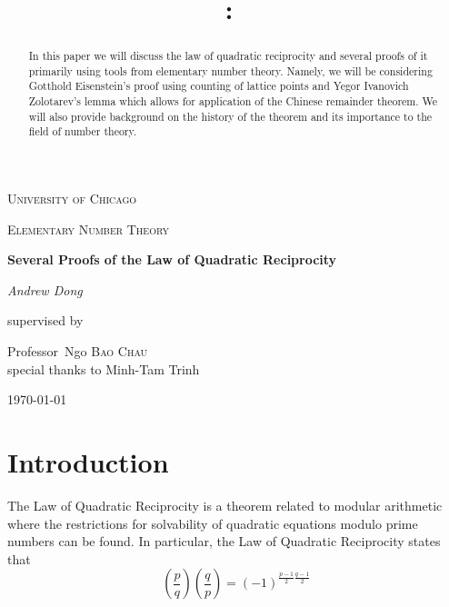\documentclass{article}
\title{\vspace{2in}\textmd{\textbf{\hmwkClass:\ \hmwkTitle}}\\\normalsize\vspace{0.1in}\vspace{0.1in}\large{\textit{\hmwkClassInstructor}}\vspace{3in}}
\date{}
\author{\textbf{\hmwkAuthorName}}
\begin{document}
\begin{spacing}{1.1}
\newpage


\clearpage

\begin{titlepage}
	\centering
	{\scshape\LARGE University of Chicago \par}
	\vspace{1cm}
	{\scshape\Large Elementary Number Theory\par}
	\vspace{1.5cm}
	{\huge\bfseries Several Proofs of the Law of Quadratic Reciprocity\par}
	\vspace{1cm}
	{\Large\itshape Andrew Dong\par}
	\vspace{2cm}
	\begin{abstract}
In this paper we will discuss the law of quadratic reciprocity and several proofs of it primarily using tools from elementary number theory.  Namely, we will be considering Gotthold Eisenstein's proof using counting of lattice points and Yegor Ivanovich Zolotarev's lemma which allows for application of the Chinese remainder theorem.  We will also provide background on the history of the theorem and its importance to the field of number theory.  

\end{abstract}
	\vfill


	supervised by\par
	Professor~Ngo \textsc{Bao Chau}
	\\ special thanks to Minh-Tam Trinh
	\vspace{5 mm}
	\\{\large \today\par}
\end{titlepage}

\section{Introduction}

The Law of Quadratic Reciprocity is a theorem related to modular arithmetic where the restrictions for solvability of quadratic equations modulo prime numbers can be found.  In particular, the Law of Quadratic Reciprocity states that
\begin{equation}
(\frac{p}{q})(\frac{q}{p}) = (-1)^{{\frac{p-1}{2}}{\frac{q-1}{2}}}
\end{equation}


\end{spacing}
\end{document}
